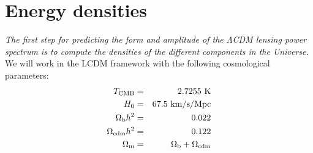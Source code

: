 \documentclass[a4paper, 11pt]{article}
\def\ba{\begin{eqnarray}}
\def\ea{\end{eqnarray}}
\begin{document}
\section{Energy densities}


{\it The first step for predicting the form and amplitude of the $\Lambda$CDM lensing power spectrum is to compute the densities of the different components in the Universe.}  \\

We will work in the LCDM framework with the following cosmological parameters:
\ba
T_{\rm CMB} &=& 2.7255 \  \rm{K} \nonumber \\
H_{0} &=& 67.5 \ \rm{ km/s/Mpc} \nonumber   \\
\Omega_{\rm b}h^{2} &=& 0.022 \nonumber   \\
\Omega_{\rm cdm}h^{2} &=& 0.122  \nonumber \\
\Omega_{\rm m} &=&  \Omega_{\rm b} +  \Omega_{\rm cdm}
\ea
\end{document}
